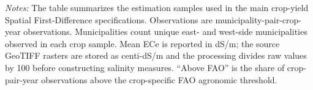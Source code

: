 \begin{table}[htbp]
\centering
\caption{Salinity Exposure Diagnostics in the Main SFD Yield Samples}
\label{tab:salinity_exposure_diagnostics_supervisor_response}
\small
{}
\par\addvspace{0.5ex}
\parbox{0.95\textwidth}{\textit{Notes:} The table summarizes the estimation samples used in the main crop-yield Spatial First-Difference specifications. Observations are municipality-pair-crop-year observations. Municipalities count unique east- and west-side municipalities observed in each crop sample. Mean ECe is reported in dS/m; the source GeoTIFF rasters are stored as centi-dS/m and the processing divides raw values by 100 before constructing salinity measures. ``Above FAO'' is the share of crop-pair-year observations above the crop-specific FAO agronomic threshold.}
\end{table}
